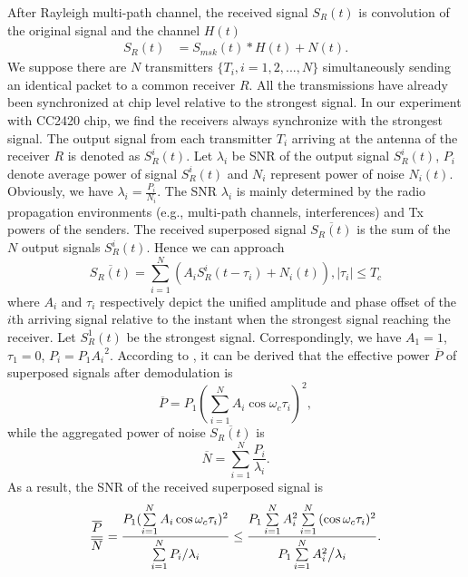 \documentclass[conference]{IEEEtran}
\begin{document}
After Rayleigh multi-path channel, the received signal $S_R(t)$ is convolution of the original signal and the channel $H(t)$
\begin{align}
\label{Equ_SRt}
 S_R (t) &= S_{msk} (t)*H(t) + N(t).
\end{align}
We suppose there are $N$ transmitters $\{T_i, i=1,2,...,N\}$ simultaneously sending an identical packet to a common receiver $R$.
All the transmissions have already been synchronized at chip level relative to the strongest signal.
In our experiment with CC2420 chip, we find the receivers always synchronize with the strongest signal.
The output signal from each transmitter $T_i$ arriving at the antenna of the receiver $R$ is denoted as $S_R^i(t)$.
Let $\lambda_i$ be SNR of the output signal $S_R^i(t)$, $P_i$ denote average power of signal $S_R^i(t)$ and $N_i$ represent power of noise $N_i(t)$.
Obviously, we have $\lambda_i=\frac{P_i}{N_i}$.
The SNR $\lambda_i$ is mainly determined by the radio propagation environments (e.g., multi-path channels, interferences) and Tx powers of the senders.
The received superposed signal $\overline{S_R (t)}$ is the sum of the $N$ output signals $S_R^i(t)$.
Hence we can approach
\begin{equation}
\label{Equ_CombineRecSignal}
\overline{S_R (t)} = \sum\limits_{i = 1}^N {(A_i S_{R}^i (t - \tau _i )+ N_i(t))},\left| {\tau {}_i} \right| \le T_c
\end{equation}
where $A_i$ and $\tau _i$ respectively depict the unified amplitude and phase offset of the $i$th arriving signal relative to the instant when the strongest signal reaching the receiver. Let $S_{R}^1 (t)$ be the strongest signal. Correspondingly, we have $A_1=1$, $\tau_1=0$, $P_i=P_1{A_i}^2$.
According to \cite{Yin2012SCIF}, it can be derived that the effective power $\overline{P}$ of superposed signals after demodulation is
\begin{equation}
\label{Equ_PowerReceiveSignal}
\overline{P}  =P_1(\sum\limits_{i = 1}^N{A_i \cos } \omega _c \tau _i )^2,
\end{equation}
while the aggregated power of noise $\overline{S_R (t)}$ is
\begin{equation}
\label{Equ_PowerReceiveNoise}
\overline{N}  =\sum\limits_{i = 1}^N{\frac{P_i}{\lambda_i}} .
\end{equation}
As a result, the SNR of the received superposed signal is
\begin{align}
\label{Equ_PowerReceiveNoise}
\frac{\overline{P}}{\overline{N}}= \frac{{P_1 (\sum\limits_{i = 1}^N {A_i \cos \omega _c \tau _i } )^2 }}{{\sum\limits_{i = 1}^N {{{P_i } \mathord{\left/
 {\vphantom {{P_i } {\lambda _i }}} \right.
 \kern-\nulldelimiterspace} {\lambda _i }}} }} \le\frac{{P_1 \sum\limits_{i = 1}^N {A_i^2 } \sum\limits_{i = 1}^N {(\cos \omega _c \tau _i )^2 } }}{{P_1 \sum\limits_{i = 1}^N {{{A_i^2 } \mathord{\left/
 {\vphantom {{A_i^2 } {\lambda _i }}} \right.\kern-\nulldelimiterspace} {\lambda _i }}} }}.
\end{align}
\end{document}

